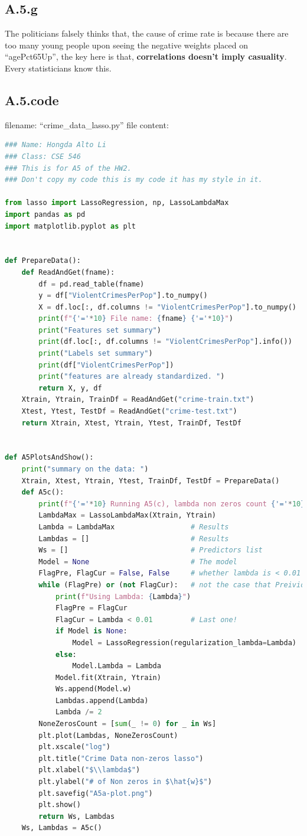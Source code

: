\documentclass[]{article}
\begin{document}
    \subsection*{A.5.g}
        The politicians falsely thinks that, the cause of crime rate is because there are too many young people upon seeing the negative weights placed on ``agePct65Up'', the key here is that, \textbf{correlations doesn't imply casuality}. Every statisticians know this. 
    \subsection*{A.5.code}
        filename: ``crime\_data\_lasso.py''
        file content: 
        \begin{lstlisting}[language=python]
### Name: Hongda Alto Li
### Class: CSE 546
### This is for A5 of the HW2.
### Don't copy my code this is my code it has my style in it.

from lasso import LassoRegression, np, LassoLambdaMax
import pandas as pd
import matplotlib.pyplot as plt


def PrepareData():
    def ReadAndGet(fname):
        df = pd.read_table(fname)
        y = df["ViolentCrimesPerPop"].to_numpy()
        X = df.loc[:, df.columns != "ViolentCrimesPerPop"].to_numpy()
        print(f"{'='*10} File name: {fname} {'='*10}")
        print("Features set summary")
        print(df.loc[:, df.columns != "ViolentCrimesPerPop"].info())
        print("Labels set summary")
        print(df["ViolentCrimesPerPop"])
        print("features are already standardized. ")
        return X, y, df
    Xtrain, Ytrain, TrainDf = ReadAndGet("crime-train.txt")
    Xtest, Ytest, TestDf = ReadAndGet("crime-test.txt")
    return Xtrain, Xtest, Ytrain, Ytest, TrainDf, TestDf


def A5PlotsAndShow():
    print("summary on the data: ")
    Xtrain, Xtest, Ytrain, Ytest, TrainDf, TestDf = PrepareData()
    def A5c():
        print(f"{'='*10} Running A5(c), lambda non zeros count {'='*10}")
        LambdaMax = LassoLambdaMax(Xtrain, Ytrain)
        Lambda = LambdaMax                  # Results
        Lambdas = []                        # Results
        Ws = []                             # Predictors list
        Model = None                        # The model
        FlagPre, FlagCur = False, False     # whether lambda is < 0.01
        while (FlagPre) or (not FlagCur):   # not the case that Preivious is > 0.01, current is < 0.01
            print(f"Using Lambda: {Lambda}")
            FlagPre = FlagCur
            FlagCur = Lambda < 0.01         # Last one!
            if Model is None:
                Model = LassoRegression(regularization_lambda=Lambda)
            else:
                Model.Lambda = Lambda
            Model.fit(Xtrain, Ytrain)
            Ws.append(Model.w)
            Lambdas.append(Lambda)
            Lambda /= 2
        NoneZerosCount = [sum(_ != 0) for _ in Ws]
        plt.plot(Lambdas, NoneZerosCount)
        plt.xscale("log")
        plt.title("Crime Data non-zeros lasso")
        plt.xlabel("$\\lambda$")
        plt.ylabel("# of Non zeros in $\hat{w}$")
        plt.savefig("A5a-plot.png")
        plt.show()
        return Ws, Lambdas
    Ws, Lambdas = A5c()


\end{lstlisting}
\end{document}
